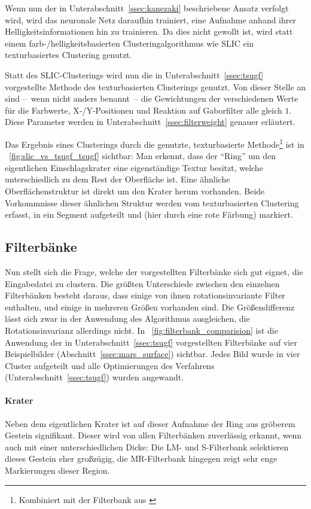 Wenn nun der in Unterabschnitt~\ref{ssec:kanezaki} beschriebene Ansatz verfolgt wird, wird das neuronale Netz daraufhin trainiert, eine Aufnahme anhand ihrer Helligkeitsinformationen hin zu trainieren. Da dies nicht gewollt ist, wird statt einem farb-/helligkeitsbasierten Clusteringalgorithmus wie SLIC ein texturbasiertes Clustering genutzt.

Statt des SLIC-Clusterings wird nun die in Unterabschnitt~\ref{ssec:tsugf} vorgestellte Methode des texturbasierten Clusterings genutzt. Von dieser Stelle an sind --~wenn nicht anders benannt~-- die Gewichtungen der verschiedenen Werte für die Farbwerte, X-/Y-Positionen und Reaktion auf Gaborfilter alle gleich $1$. Diese Parameter werden in Unterabschnitt~\ref{ssec:filterweight} genauer erläutert.

Das Ergebnis eines Clusterings durch die genutzte, texturbasierte Methode\footnote{Kombiniert mit der Filterbank aus \cite{jain_91}} ist in \figurename~\ref{fig:slic_vs_tsugf_tsugf} sichtbar: Man erkennt, dass der \enquote{Ring} um den eigentlichen Einschlagskrater eine eigenständige Textur besitzt, welche unterschiedlich zu dem Rest der Oberfläche ist. Eine ähnliche Oberflächenstruktur ist direkt um den Krater herum vorhanden. Beide Vorkommnisse dieser ähnlichen Struktur werden vom texturbasierten Clustering erfasst, in ein Segment aufgeteilt und (hier durch eine rote Färbung) markiert.

\subsection{Filterbänke}

Nun stellt sich die Frage, welche der vorgestellten Filterbänke sich gut eignet, die Eingabedatei zu clustern. Die größten Unterschiede zwischen den einzelnen Filterbänken besteht daraus, dass einige von ihnen rotationsinvariante Filter enthalten, und einige in mehreren Größen vorhanden sind. Die Größendifferenz lässt sich zwar in der Anwendung des Algorithmus ausgleichen, die Rotationsinvarianz allerdings nicht. In \figurename~\ref{fig:filterbank_comparision} ist die Anwendung der in Unterabschnitt~\ref{ssec:tsugf} vorgestellten Filterbänke auf vier Beispielbilder (\vgl Abschnitt~\ref{ssec:mars_surface}) sichtbar. Jedes Bild wurde in vier Cluster aufgeteilt und alle Optimierungen des Verfahrens (\vgl Unterabschnitt~\ref{ssec:tsugf}) wurden angewandt.

\paragraph{Krater}
Neben dem eigentlichen Krater ist auf dieser Aufnahme der Ring aus gröberem Gestein signifikant. Dieser wird von allen Filterbänken zuverlässig erkannt, wenn auch mit einer unterschiedlichen Dicke: Die LM- und S-Filterbank selektieren dieses Gestein eher großzügig, die MR-Filterbank hingegen zeigt sehr enge Markierungen dieser Region.


